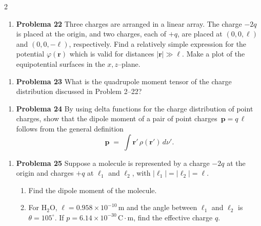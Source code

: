 \documentclass{article}
\begin{document}
\begin{multicols}{2}
\begin{enumerate}[label={{\textcolor{trueblue}{\textbf{Pr.} \arabic*.22}}}, start=2]
\item \textbf{Problema 22} \; Three charges are arranged in a linear array. The charge $-2q$ is placed at the origin, and two charges, each of $+q$, are placed at $(0,0,\ell)$ and $(0,0,-\ell)$, respectively. Find a relatively simple expression for the potential $\varphi(\boldsymbol{r})$ which is valid for distances $\lvert \boldsymbol{r}\rvert \gg \ell$. Make a plot of the equipotential surfaces in the $x,z$–plane.
\end{enumerate}

\begin{enumerate}[label={{\textcolor{trueblue}{\textbf{Pr.} \arabic*.23}}}, start=2]
\item \textbf{Problema 23} \; What is the quadrupole moment tensor of the charge distribution discussed in Problem 2–22?
\end{enumerate}

\begin{enumerate}[label={{\textcolor{trueblue}{\textbf{Pr.} \arabic*.24}}}, start=2]
\item \textbf{Problema 24} \; By using delta functions for the charge distribution of point charges, show that the dipole moment of a pair of point charges $\,\boldsymbol{p}=q\,\boldsymbol{\ell}\,$ follows from the general definition
\[
\boldsymbol{p} \;=\; \int \boldsymbol{r}'\,\rho(\boldsymbol{r}')\,d\nu'.
\]
\end{enumerate}

\begin{enumerate}[label={{\textcolor{trueblue}{\textbf{Pr.} \arabic*.25}}}, start=2]
\item \textbf{Problema 25} \; Suppose a molecule is represented by a charge $-2q$ at the origin and charges $+q$ at $\boldsymbol{\ell}_1$ and $\boldsymbol{\ell}_2$, with $\lvert \boldsymbol{\ell}_1\rvert=\lvert \boldsymbol{\ell}_2\rvert=\ell$.
\begin{enumerate}[label=(\alph*)]
  \item Find the dipole moment of the molecule.
  \item For $\mathrm{H_2O}$, $\ell=0.958\times 10^{-10}\,\mathrm{m}$ and the angle between $\boldsymbol{\ell}_1$ and $\boldsymbol{\ell}_2$ is $\theta=105^\circ$. If $p=6.14\times 10^{-30}\,\mathrm{C\cdot m}$, find the effective charge $q$.
\end{enumerate}
\end{enumerate}


\end{multicols}
\end{document}
